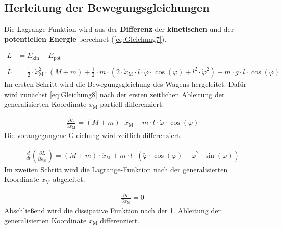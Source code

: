 \subsection{Herleitung der Bewegungsgleichungen}

Die Lagrange-Funktion wird aus der \textbf{Differenz} der \textbf{kinetischen} und der \textbf{potentiellen Energie} berechnet (\autoref{eq:Gleichung7}).

\begin{align} 
        L &= E_{\mathrm{kin}} - E_{\mathrm{pot}}  \label{eq:Gleichung7} \\\nonumber\\ 
        L &= \frac{1}{2} \cdot \dot{x}_{\mathrm{M}}^2 \cdot (M + m) + \frac{1}{2} \cdot m \cdot \left( 2 \cdot \dot{x}_{\mathrm{M}} \cdot l \cdot \dot{\varphi} \cdot \cos({\varphi}) + l^2 \cdot \dot{\varphi}^2\right) - m \cdot g \cdot l \cdot \cos({\varphi}) \label{eq:Gleichung8}
\end{align}
\newline
Im ersten Schritt wird die Bewegungsgleichung des Wagens hergeleitet. Dafür wird zunächst \autoref{eq:Gleichung8} nach der ersten zeitlichen Ableitung der generalisierten Koordinate $x_{\mathrm{M}}$ partiell differenziert:

\begin{align}\label{eq:Gleichung9}
    \frac{\partial L}{\partial \dot{x}_{\mathrm{M}}} = (M + m) \cdot \dot{x}_{\mathrm{M}} + m \cdot l \cdot \dot{\varphi} \cdot \cos(\varphi)
\end{align}
\newline
Die vorangegangene Gleichung wird zeitlich differenziert:

\begin{align}\label{eq:Gleichung10}
    \frac{d}{dt}\left(\frac{\partial L}{\partial \dot{x}_{\mathrm{M}}}\right) = (M + m) \cdot \ddot{x}_{\mathrm{M}} + m \cdot l \cdot \left(\ddot{\varphi} \cdot \cos(\varphi) - \dot{\varphi}^2 \cdot \sin(\varphi) \right)
\end{align}
\newline
Im zweiten Schritt wird die Lagrange-Funktion nach der generalisierten Koordinate $x_{\mathrm{M}}$ abgeleitet.

\begin{align}\label{eq:Gleichung11}
    \frac{\partial L}{\partial x_{\mathrm{M}}} = 0
\end{align}
\newline
Abschließend wird die dissipative Funktion nach der 1. Ableitung der generalisierten Koordinate $x_{\mathrm{M}}$ differenziert.


